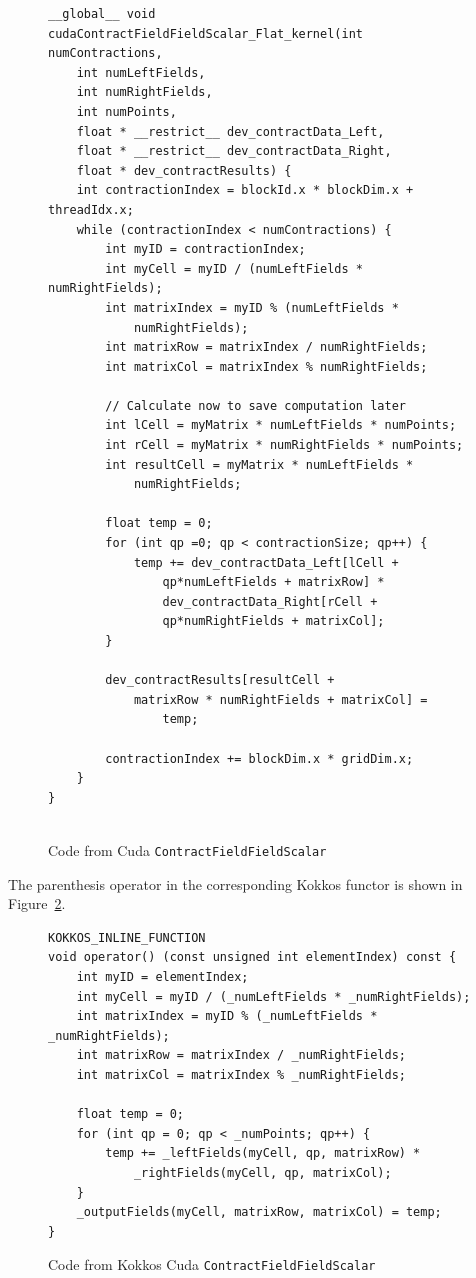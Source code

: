 \begin{figure}[htb]
	\begin{lstlisting}
__global__ void
cudaContractFieldFieldScalar_Flat_kernel(int numContractions,
	int numLeftFields,
	int numRightFields,
	int numPoints,
	float * __restrict__ dev_contractData_Left,
	float * __restrict__ dev_contractData_Right,
	float * dev_contractResults) {
	int contractionIndex = blockId.x * blockDim.x + threadIdx.x;
	while (contractionIndex < numContractions) {
		int myID = contractionIndex;
		int myCell = myID / (numLeftFields * numRightFields);
		int matrixIndex = myID % (numLeftFields * 
			numRightFields);
		int matrixRow = matrixIndex / numRightFields;
		int matrixCol = matrixIndex % numRightFields;
		
		// Calculate now to save computation later
		int lCell = myMatrix * numLeftFields * numPoints;
		int rCell = myMatrix * numRightFields * numPoints;
		int resultCell = myMatrix * numLeftFields * 
			numRightFields;
		
		float temp = 0;
		for (int qp =0; qp < contractionSize; qp++) {
			temp += dev_contractData_Left[lCell + 
				qp*numLeftFields + matrixRow] *
				dev_contractData_Right[rCell + 
				qp*numRightFields + matrixCol];
		}

		dev_contractResults[resultCell + 
			matrixRow * numRightFields + matrixCol] = 
				temp;
		
		contractionIndex += blockDim.x * gridDim.x;
	}
}
	
	\end{lstlisting}
\caption{Code from Cuda \texttt{ContractFieldFieldScalar}
\label{lst:ContractFieldFieldScalar Cuda kernel}}
\end{figure}

The parenthesis operator in the corresponding Kokkos functor is shown in
Figure~\ref{lst:ContractFieldFieldScalar Kokkos Cuda functor}.

\begin{figure}[htb]
	\begin{lstlisting}
KOKKOS_INLINE_FUNCTION
void operator() (const unsigned int elementIndex) const {
	int myID = elementIndex;
	int myCell = myID / (_numLeftFields * _numRightFields);
	int matrixIndex = myID % (_numLeftFields * _numRightFields);
	int matrixRow = matrixIndex / _numRightFields;
	int matrixCol = matrixIndex % _numRightFields;

	float temp = 0;
	for (int qp = 0; qp < _numPoints; qp++) {
		temp += _leftFields(myCell, qp, matrixRow) *
			_rightFields(myCell, qp, matrixCol);
	}
	_outputFields(myCell, matrixRow, matrixCol) = temp;
}
	\end{lstlisting}
\caption{Code from Kokkos Cuda \texttt{ContractFieldFieldScalar}
\label{lst:ContractFieldFieldScalar Kokkos Cuda functor}}
\end{figure}

